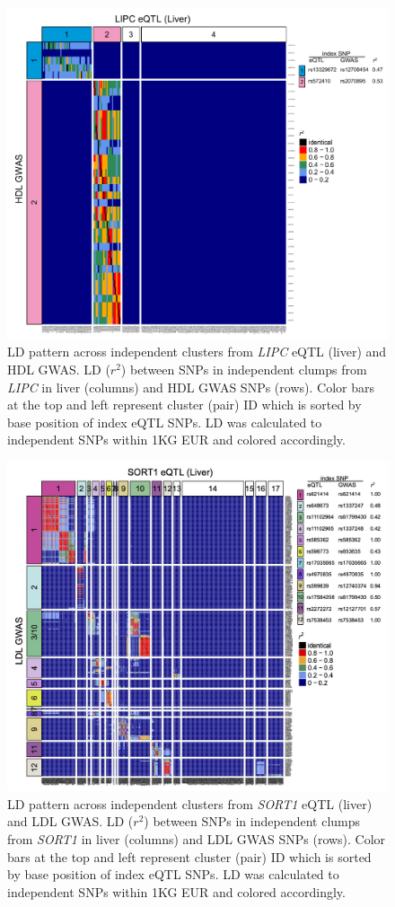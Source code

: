 \documentclass[11pt]{article}
\begin{document}
\begin{figure}[!ht]
  \centering
  \includegraphics[width=.7\textwidth]{figs/heatmap_lipc}
  \caption{LD pattern across independent clusters from \emph{LIPC}
    eQTL (liver) and HDL GWAS. LD ($r^2$) between SNPs in independent
    clumps from \emph{LIPC} in liver (columns) and HDL GWAS SNPs
    (rows). Color bars at the top and left represent cluster (pair) ID
    which is sorted by base position of index eQTL SNPs. LD was
    calculated to independent SNPs within 1KG EUR and colored
    accordingly.} 
\end{figure}

\begin{figure}[!ht]
  \centering
  \includegraphics[width=.7\textwidth]{figs/heatmap_sort1.jpg}
  \caption{LD pattern across independent clusters from \emph{SORT1}
    eQTL (liver) and LDL GWAS. LD ($r^2$) between SNPs in independent
    clumps from \emph{SORT1} in liver (columns) and LDL GWAS SNPs
    (rows). Color bars at the top and left represent cluster (pair) ID
    which is sorted by base position of index eQTL SNPs. LD was
    calculated to independent SNPs within 1KG EUR and colored
    accordingly.}
  \label{fig:ld5}
\end{figure}
\end{document}

